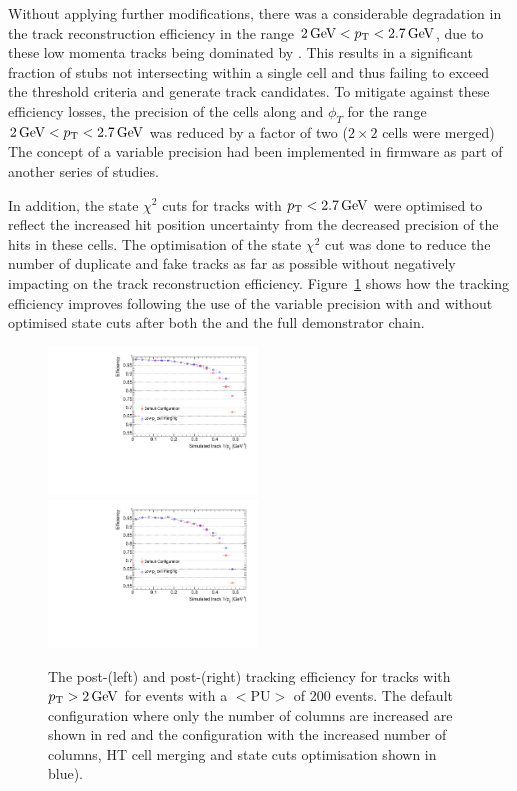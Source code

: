 Without applying further modifications, there was a considerable degradation in the track reconstruction efficiency in the range $2\,\text{Ge\hspace{-.08em}V} < p_{\mathrm{T}} < 2.7\,\text{Ge\hspace{-.08em}V}$, due to these low momenta tracks being dominated by \MS.
This results in a significant fraction of stubs not intersecting within a single \HT cell and thus failing to exceed the threshold criteria and generate track candidates.
To mitigate against these efficiency losses, the precision of the \HT cells along \qpt and $\phi_{T}$ for the range $2\,\text{Ge\hspace{-.08em}V} < p_{\mathrm{T}} < 2.7\,\text{Ge\hspace{-.08em}V}$ was reduced by a factor of two (\ie $2 \times 2$ cells were merged)
The concept of a variable precision \HT had been implemented in firmware as part of another series of studies.

In addition, the \KF state $\chi^2$ cuts for tracks with $p_{\mathrm{T}} < 2.7\,\text{Ge\hspace{-.08em}V}$ were optimised to reflect the increased hit position uncertainty from the decreased precision of the hits in these \HT cells.
The optimisation of the \KF state $\chi^2$ cut was done to reduce the number of duplicate and fake tracks as far as possible without negatively impacting on the \HT track reconstruction efficiency.
Figure~\ref{fig:2GeVFlatEff} shows how the tracking efficiency improves following the use of the variable precision \HT with and without optimised \KF state cuts after both the \HT and the full demonstrator chain. 

\begin{figure}[htb]
\centering
\includegraphics[width=0.495\textwidth]{figs/tk-upgrade/results-lowPtTracking/htTrackingEffVsInvPtFlatGeometry_5000.pdf}
\includegraphics[width=0.495\textwidth]{figs/tk-upgrade/results-lowPtTracking/kfTrackingEffVsInvPtFlatGeometry_5000.pdf}
\caption{The post-\HT (left) and post-\KF (right) tracking efficiency for tracks with $p_{\mathrm{T}} > 2\,\text{Ge\hspace{-.08em}V}$ for \ttbar events with a $<\textrm{PU}>$ of 200 events. The default configuration where only the number of \qpt columns are increased are shown in red and the configuration with the increased number of columns, HT cell merging and \KF state cuts optimisation shown in blue).
}
\label{fig:2GeVFlatEff}	
\end{figure}

